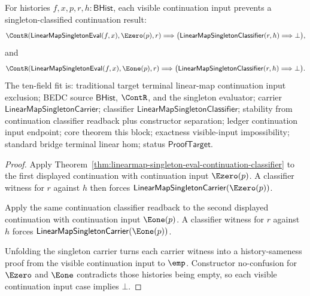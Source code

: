 \begin{theorem}
\label{thm:linearmap-singleton-eval-continuation-visible-input-exclusion}
For histories $f,x,p,r,h:\mathsf{BHist}$, each visible continuation input
prevents a singleton-classified continuation result:
$$
\ContR(\mathsf{LinearMapSingletonEval}(f,x),\Ezero(p),r)
\Longrightarrow
\bigl(\mathsf{LinearMapSingletonClassifier}(r,h)\Longrightarrow\bot\bigr),
$$
and
$$
\ContR(\mathsf{LinearMapSingletonEval}(f,x),\Eone(p),r)
\Longrightarrow
\bigl(\mathsf{LinearMapSingletonClassifier}(r,h)\Longrightarrow\bot\bigr).
$$
The ten-field fit is: traditional target terminal linear-map continuation
input exclusion; BEDC source $\mathsf{BHist}$, $\ContR$, and the singleton
evaluator; carrier $\mathsf{LinearMapSingletonCarrier}$; classifier
$\mathsf{LinearMapSingletonClassifier}$; stability from continuation
classifier readback plus constructor separation; ledger continuation input
endpoint; core theorem this block; exactness visible-input impossibility;
standard bridge terminal linear hom; status $\mathsf{ProofTarget}$.
\end{theorem}
\begin{proof}
Apply Theorem~\ref{thm:linearmap-singleton-eval-continuation-classifier} to
the first displayed continuation with continuation input $\Ezero(p)$. A
classifier witness for $r$ against $h$ then forces
$\mathsf{LinearMapSingletonCarrier}(\Ezero(p))$.

Apply the same continuation classifier readback to the second displayed
continuation with continuation input $\Eone(p)$. A classifier witness for $r$
against $h$ forces $\mathsf{LinearMapSingletonCarrier}(\Eone(p))$.

Unfolding the singleton carrier turns each carrier witness into a
history-sameness proof from the visible continuation input to $\emp$.
Constructor no-confusion for $\Ezero$ and $\Eone$ contradicts those histories
being empty, so each visible continuation input case implies $\bot$.
\end{proof}
